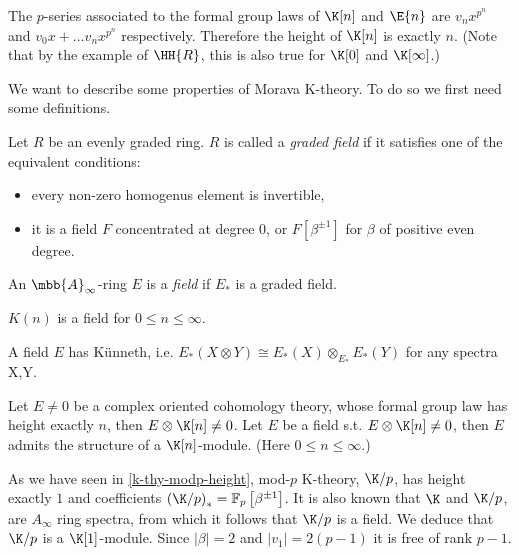 \begin{corollary}\label{k-e-p-series}
	The $p$-series associated to the formal group laws of $\K[n]$ and $\E{n}$ are $v_n x^{p^n}$ and $v_0 x + \dotsc v_n x^{p^n}$ respectively.
	Therefore the height of $\K[n]$ is exactly $n$.
	(Note that by the example of $\HH{R}$, this is also true for $\K[0]$ and $\K[\infty]$.)
\end{corollary}

We want to describe some properties of Morava K-theory.
To do so we first need some definitions.

\begin{definition}
	Let $R$ be an evenly graded ring.
	$R$ is called a \emph{graded field} if it satisfies one of the equivalent conditions:
	\begin{itemize}
		\item every non-zero homogenus element is invertible,
		\item it is a field $F$ concentrated at degree 0, or $F\left[\beta^{\pm1}\right]$ for $\beta$ of positive even degree.
	\end{itemize}
	An $\mbb{A}_\infty$-ring $E$ is a \emph{field} if $E_*$ is a graded field.
\end{definition}

\begin{example}
	$K\left(n\right)$ is a field for $0 \leq n \leq \infty$.
\end{example}

\begin{proposition}
	A field $E$ has K\"unneth, i.e. $E_*\left(X\otimes Y\right)\cong E_*\left(X\right)\otimes_{E_*}E_*\left(Y\right)$ for any spectra X,Y.
\end{proposition}

\begin{proposition}
	Let $E \neq 0$ be a complex oriented cohomology theory, whose formal group law has height exactly $n$, then $E \otimes \K[n] \neq 0$.
	Let $E$ be a field s.t. $E \otimes \K[n] \neq 0$, then $E$ admits the structure of a $\K[n]$-module.
	(Here $0 \leq n \leq \infty$.)
\end{proposition}

\begin{example}\label{k-thy-modp-morava}
	As we have seen in \ref{k-thy-modp-height}, mod-$p$ K-theory, $\K/p$, has height exactly $1$ and coefficients $\left(\K/p\right)_* = \mathbb{F}_p \left[\beta^{\pm 1}\right]$.
	It is also known that $\K$ and $\K/p$, are $A_\infty$ ring spectra, from which it follows that $\K/p$ is a field.
	We deduce that $\K/p$ is a $\K[1]$-module.
	Since $\left|\beta\right| = 2$ and $\left|v_1\right| = 2\left(p-1\right)$ it is free of rank $p-1$.
\end{example}

